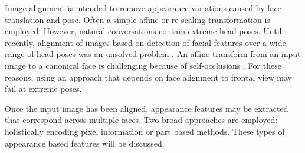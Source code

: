 Image alignment is intended to remove appearance variations caused by face translation and pose. Often a simple affine or re-scaling transformation is employed. However, natural conversations contain extreme head poses. Until recently, alignment of images based on detection of facial features over a wide range of head poses was an unsolved problem \cite{Zhu2012}. An affine transform from an input image to a canonical face is challenging because of self-occlusions \cite{Yang2011}. For these reasons, using an approach that depends on face alignment to frontal view may fail at extreme poses.

Once the input image has been aligned, appearance features may be extracted that correspond across multiple faces. Two broad approaches are employed: holistically encoding pixel information or part based methods. These types of appearance based features will be discussed.

